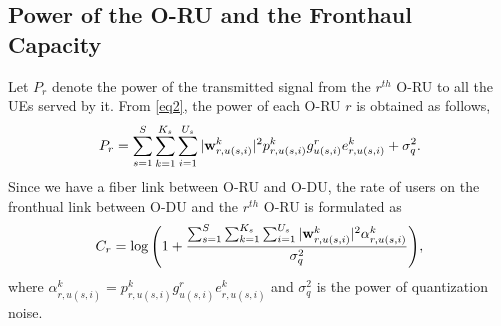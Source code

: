 \documentclass[lettersize,journal]{IEEEtran}
\begin{document}
\subsection{Power of the O-RU and the Fronthaul Capacity}
Let $P_r$ denote the power of the transmitted signal from the $r^{th}$ O-RU to all the UEs served by it. From \eqref{eq2}, the power of each O-RU $r$ is obtained as follows, 
\begin{equation}\label{pr}
P_r = \sum_{s=1}^{S}\sum_{k=1}^{K_s}\sum_{i=1}^{U_s}|\bold{w}_{r,u(s,i)}^{k}|^2 p_{r,u(s,i)}^{k} g_{u(s,i)}^r e^k_{r,u(s,i)}+ \sigma_{q}^2.
\end{equation}
Since we have a fiber link between O-RU and O-DU, the rate of users on the fronthual link between O-DU and the $r^{th}$ O-RU  is formulated as
\begin{equation}\label{cr}
C_{r} = \log{\left(1+ \frac{\sum_{s=1}^{S}\sum_{k=1}^{K_s}\sum_{i=1}^{U_s}|\bold{w}_{r,u(s,i)}^{k}|^2 \mathcal{\alpha}^k_{r,u(s,i)} }{ \sigma_{q}^2}\right)},
\end{equation}
where $\mathcal{\alpha}^k_{r,u(s,i)}= p_{r,u(s,i)}^{k} g_{u(s,i)}^r e^k_{r,u(s,i)}$ and $\sigma_{q}^2$ is the power of quantization noise.
\end{document}
